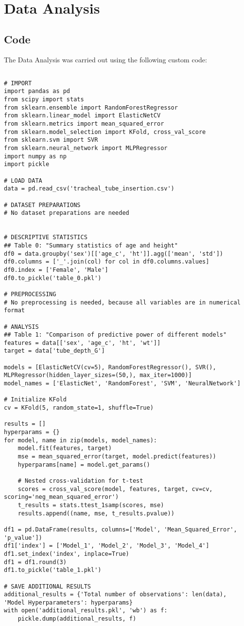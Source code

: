 \documentclass[11pt]{article}
\begin{document}
\section{Data Analysis}
\subsection{{Code}}
The Data Analysis was carried out using the following custom code:

\begin{verbatim}

# IMPORT
import pandas as pd
from scipy import stats
from sklearn.ensemble import RandomForestRegressor
from sklearn.linear_model import ElasticNetCV
from sklearn.metrics import mean_squared_error
from sklearn.model_selection import KFold, cross_val_score
from sklearn.svm import SVR
from sklearn.neural_network import MLPRegressor
import numpy as np
import pickle

# LOAD DATA
data = pd.read_csv('tracheal_tube_insertion.csv')

# DATASET PREPARATIONS
# No dataset preparations are needed


# DESCRIPTIVE STATISTICS
## Table 0: "Summary statistics of age and height"
df0 = data.groupby('sex')[['age_c', 'ht']].agg(['mean', 'std'])
df0.columns = ['_'.join(col) for col in df0.columns.values]
df0.index = ['Female', 'Male']
df0.to_pickle('table_0.pkl')

# PREPROCESSING 
# No preprocessing is needed, because all variables are in numerical format

# ANALYSIS
## Table 1: "Comparison of predictive power of different models"
features = data[['sex', 'age_c', 'ht', 'wt']]
target = data['tube_depth_G']

models = [ElasticNetCV(cv=5), RandomForestRegressor(), SVR(), MLPRegressor(hidden_layer_sizes=(50,), max_iter=1000)]
model_names = ['ElasticNet', 'RandomForest', 'SVM', 'NeuralNetwork']

# Initialize KFold
cv = KFold(5, random_state=1, shuffle=True)

results = []
hyperparams = {}
for model, name in zip(models, model_names):
    model.fit(features, target)
    mse = mean_squared_error(target, model.predict(features))
    hyperparams[name] = model.get_params()
    
    # Nested cross-validation for t-test
    scores = cross_val_score(model, features, target, cv=cv, scoring='neg_mean_squared_error')
    t_results = stats.ttest_1samp(scores, mse)
    results.append((name, mse, t_results.pvalue))

df1 = pd.DataFrame(results, columns=['Model', 'Mean_Squared_Error', 'p_value'])
df1['index'] = ['Model_1', 'Model_2', 'Model_3', 'Model_4']
df1.set_index('index', inplace=True)
df1 = df1.round(3)
df1.to_pickle('table_1.pkl')

# SAVE ADDITIONAL RESULTS
additional_results = {'Total number of observations': len(data), 'Model Hyperparameters': hyperparams}
with open('additional_results.pkl', 'wb') as f:
    pickle.dump(additional_results, f)

\end{verbatim}
\end{document}
